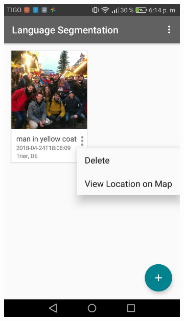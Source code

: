 \begin{figure}[!htbp]
    \centering
    \begin{multicols}{3}
    \begin{subfigure}[b]{\columnwidth}
            \centering
            \includegraphics[width=\textwidth]{./figures/dmn_app/views/15.png}
    \label{subfig:additional_menu}
    \end{subfigure}
    

\end{multicols}
\end{figure}
